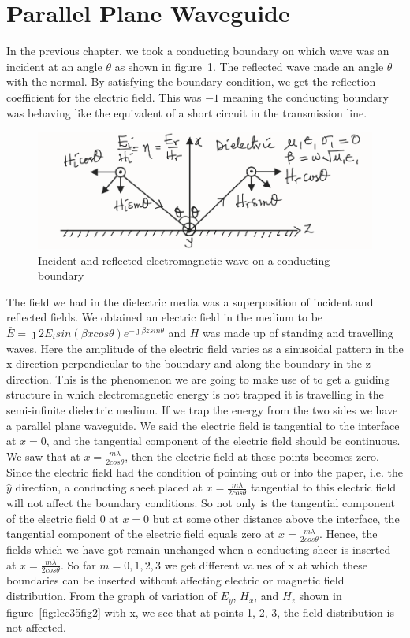 \section{Parallel Plane Waveguide}
In the previous chapter, we took a conducting boundary on which wave was an incident at an angle $\theta$ as shown in figure~\ref{fig:lec35fig1}. The reflected wave made an angle $\theta$ with the normal. By satisfying the boundary condition, we get the reflection coefficient for the electric field. This was $-1$ meaning the conducting boundary was behaving like the equivalent of a short circuit in the transmission line.
\begin{figure}[h]
\centering
\includegraphics[width=1\linewidth]{./graphics/lec35fig1}
\caption{Incident and reflected electromagnetic wave on a conducting boundary}
\label{fig:lec35fig1}
\end{figure}
The field we had in the dielectric media was a superposition of incident and reflected fields. We obtained an electric field in the medium to be $\bar{E} = \jmath 2E_isin(\beta xcos\theta)e^{-\jmath\beta zsin\theta}$ and $H$ was made up of standing and travelling waves. Here the amplitude of the electric field varies as a sinusoidal pattern in the x-direction perpendicular to the boundary and along the boundary in the z-direction. This is the phenomenon we are going to make use of to get a guiding structure in which electromagnetic energy is not trapped it is travelling in the semi-infinite dielectric medium. If we trap the energy from the two sides we have a parallel plane waveguide. We said the electric field is tangential to the interface at $x=0$, and the tangential component of the electric field should be continuous. We saw that at $x=\frac{m\lambda}{2cos\theta}$, then the electric field at these points becomes zero. Since the electric field had the condition of pointing out or into the paper, i.e. the $\hat{y}$ direction, a conducting sheet placed at $x=\frac{m\lambda}{2cos\theta}$ tangential to this electric field will not affect the boundary conditions. So not only is the tangential component of the electric field 0 at $x=0$ but at some other distance above the interface, the tangential component of the electric field equals zero at $x=\frac{m\lambda}{2cos\theta}$. Hence, the fields which we have got remain unchanged when a conducting sheer is inserted at $x=\frac{m\lambda}{2cos\theta}$. So far $m=0, 1, 2, 3$ we get different values of x at which these boundaries can be inserted without affecting electric or magnetic field distribution. From the graph of variation of $E_y$, $H_x$, and $H_z$ shown in figure~\ref{fig:lec35fig2} with x, we see that at points 1, 2, 3, the field distribution is not affected.
